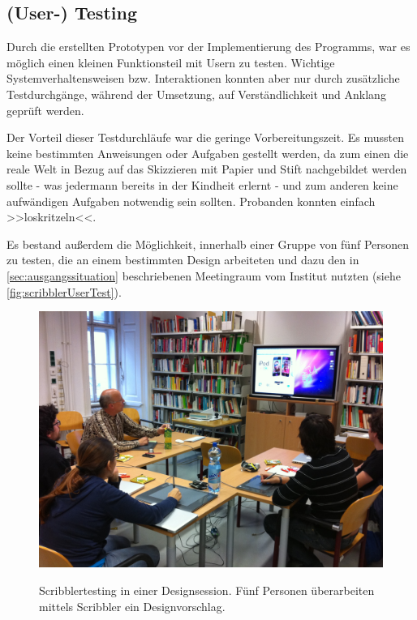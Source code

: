 \subsection{(User-) Testing}
Durch die erstellten Prototypen vor der Implementierung des Programms, war es möglich einen kleinen Funktionsteil mit Usern zu testen. Wichtige Systemverhaltensweisen bzw. Interaktionen konnten aber nur durch zusätzliche Testdurchgänge, während der Umsetzung, auf Verständlichkeit und Anklang geprüft werden.

\medskip Der Vorteil dieser Testdurchläufe war die geringe Vorbereitungszeit. Es mussten keine bestimmten Anweisungen oder Aufgaben gestellt werden, da zum einen die reale Welt in Bezug auf das Skizzieren mit Papier und Stift nachgebildet werden sollte - was jedermann bereits in der Kindheit erlernt - und zum anderen keine aufwändigen Aufgaben notwendig sein sollten. Probanden konnten einfach >>loskritzeln<<.

\medskip Es bestand außerdem die Möglichkeit, \scribbler innerhalb einer Gruppe von fünf Personen zu testen, die an einem bestimmten Design arbeiteten und dazu den in \autoref{sec:ausgangssituation} beschriebenen Meetingraum vom Institut nutzten (siehe \autoref{fig:scribblerUserTest}).

\begin{figure}
	        {\includegraphics[width=1\linewidth]{gfx/scribblerUserTest}}
		\caption[Scribblertesting in einer Designsession]{Scribblertesting in einer Designsession. Fünf Personen überarbeiten mittels Scribbler ein Designvorschlag.}\label{fig:scribblerUserTest}
\end{figure}


